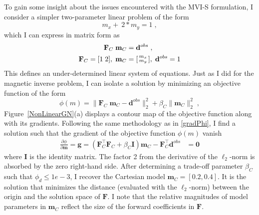 To gain some insight about the issues encountered with the MVI-S formulation, I consider a simpler two-parameter linear problem of the form
\begin{equation}
m_x + \:2*m_y =1 \;,
\end{equation}
which I can express in matrix form as
\begin{equation}\label{twoParam}
\begin{split}
\mathbf{F}_C\;\mathbf{m}_C &= \mathbf{d}^{obs} \;,\\
\mathbf{F}_C = [1\;2], \;
\mathbf{m}_C &=
\begin{bsmallmatrix}
m_x\\
m_y
\end{bsmallmatrix}, \;
\mathbf{d}^{obs} = 1
\end{split}
\end{equation}
This defines an under-determined linear system of equations. Just as I did for the magnetic inverse problem, I can isolate a solution by minimizing an objective function of the form
\begin{equation}\label{toyProblem}
\phi(m) = \| \mathbf{F}_C\;\mathbf{m}_C - \mathbf{d}^{obs} \|_2^2 + \beta_C \| \mathbf{m}_C \|_2^2 \;,
\end{equation}
Figure~\ref{NonLinearGN}(a) displays a contour map of the objective function along with its gradients.
Following the same methodology as in \eqref{gradPhi}, I find a solution such that the gradient of the objective function $\phi(m)$ vanish
\begin{equation}\label{gradLinear}
\begin{split}
\frac{\partial \phi}{\partial \mathbf{m}}=\mathbf{g} = \left(\mathbf{F}_C^\top\mathbf{F}_C + \beta_C \mathbf{I}\right) \mathbf{m}_C - \mathbf{F}_C^\top \mathbf{d}^{obs} &= \mathbf{0}
\end{split}
\end{equation}
where $\mathbf{I}$ is the identity matrix. The factor 2 from the derivative of the $\ell_2$-norm is absorbed by the zero right-hand side.
After determining a trade-off parameter $\beta_C$ such that $\phi_d \leq 1e-3$, I recover the Cartesian model $\mathbf{m}_C=[0.2, 0.4]$. It is the solution that minimizes the distance (evaluated with the $\ell_2$-norm) between the origin and the solution space of $\mathbf{F}$. I note that the relative magnitudes of model parameters in $\mathbf{m}_C$ reflect the size of the forward coefficients in $\mathbf{F}$.
